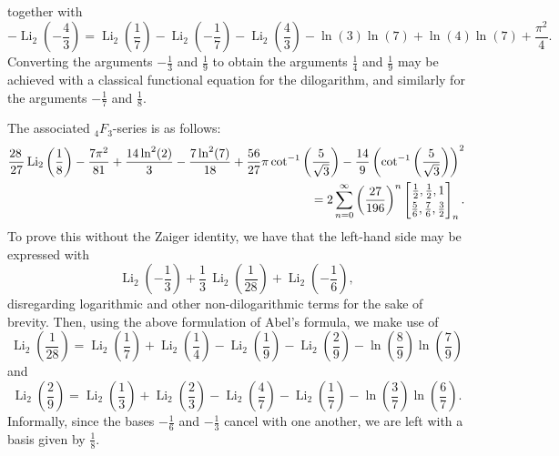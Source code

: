 \documentclass[12pt]{article}
\begin{document}
 together with $$ -\operatorname{Li}_2\left(-\frac{4}{3}\right) = \operatorname{Li}_2\left(\frac{1}{7}\right) - \operatorname{Li}_2\left(-\frac{1}{7}\right) - 
 \operatorname{Li}_2\left(\frac{4}{3}\right) - \ln(3)\ln(7) + \ln(4)\ln(7) + \frac{\pi^2}{4}. $$ Converting the arguments $-\frac{1}{3}$ and 
 $\frac{1}{9}$ to obtain the arguments $\frac{1}{4}$ and $\frac{1}{9}$ may be achieved with a classical functional equation for the 
 dilogarithm, and similarly for the arguments $-\frac{1}{7}$ and $\frac{1}{8}$. 

 The associated ${}_{4}F_{3}$-series is as follows: 
\begin{equation*}
\begin{aligned}
 \frac{28 \, }{27} \operatorname{Li}_2\left(\frac{1}{8}\right) - \frac{7 \pi^2}{81} + 
 \frac{14 \ln^2(2)}{3} - \frac{7 \ln^2(7)}{18} + \frac{56}{27} \pi \cot^{-1}\left(\frac{5}{\sqrt{3}}\right) - 
 \frac{14}{9} \left(\cot^{-1}\left(\frac{5}{\sqrt{3}}\right)\right)^2 \\ 
 = 2\sum_{n=0}^{\infty} \left( \frac{27}{196} \right)^{n} 
 \left[ \begin{matrix} \frac{1}{2}, \frac{1}{2}, 1 
 \vspace{1mm} \\ 
 \frac{5}{6}, \frac{7}{6}, \frac{3}{2} \end{matrix} \right]_{n}. 
\end{aligned}
\end{equation*}
 To prove this without the Zaiger identity, we have that 
 the left-hand side may be expressed with 
\begin{equation*}
 \operatorname{Li}_2\left(-\frac{1}{3}\right) + \frac{1}{3} \, \operatorname{Li}_2\left(\frac{1}{28}\right) + \operatorname{Li}_2\left(-\frac{1}{6}\right), 
\end{equation*}
 disregarding logarithmic and other non-dilogarithmic terms for the sake of brevity. Then, using the above formulation of Abel's 
 formula, we make use of 
\begin{equation*}
 \operatorname{Li}_2\left(\frac{1}{28}\right) = \operatorname{Li}_2\left(\frac{1}{7}\right) + 
 \operatorname{Li}_2\left(\frac{1}{4}\right) - \operatorname{Li}_2\left(\frac{1}{9}\right) - 
 \operatorname{Li}_2\left(\frac{2}{9}\right) - \ln\left(\frac{8}{9}\right)\ln\left(\frac{7}{9}\right) 
\end{equation*}
 and 
\begin{equation*}
 \operatorname{Li}_2\left(\frac{2}{9}\right) = \operatorname{Li}_2\left(\frac{1}{3}\right) + 
 \operatorname{Li}_2\left(\frac{2}{3}\right) - \operatorname{Li}_2\left(\frac{4}{7}\right) - 
 \operatorname{Li}_2\left(\frac{1}{7}\right) - \ln\left(\frac{3}{7}\right)\ln\left(\frac{6}{7}\right). 
\end{equation*}
 Informally, since the bases $-\frac{1}{6}$ and $-\frac{1}{3}$ 
 cancel with one another, we are left with a basis given by $\frac{1}{8}$. 
\end{document}
